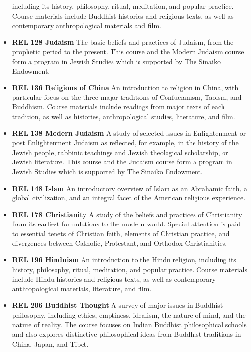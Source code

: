 \documentclass[
  letterpaper,
]{scrbook}
\begin{document}
\begin{itemize}
  including its history, philosophy, ritual, meditation, and popular
  practice. Course materials include Buddhist histories and religious
  texts, as well as contemporary anthropological materials and film.
\item
  \textbf{REL 128 Judaism} The basic beliefs and practices of Judaism,
  from the prophetic period to the present. This course and the Modern
  Judaism course form a program in Jewish Studies which is supported by
  The Sinaiko Endowment.
\item
  \textbf{REL 136 Religions of China} An introduction to religion in
  China, with particular focus on the three major traditions of
  Confucianism, Taoism, and Buddhism. Course materials include readings
  from major texts of each tradition, as well as histories,
  anthropological studies, literature, and film.\\
\item
  \textbf{REL 138 Modern Judaism} A study of selected issues in
  Enlightenment or post Enlightenment Judaism as reflected, for example,
  in the history of the Jewish people, rabbinic teachings and Jewish
  theological scholarship, or Jewish literature. This course and the
  Judaism course form a program in Jewish Studies which is supported by
  The Sinaiko Endowment.
\item
  \textbf{REL 148 Islam} An introductory overview of Islam as an
  Abrahamic faith, a global civilization, and an integral facet of the
  American religious experience.\\
\item
  \textbf{REL 178 Christianity} A study of the beliefs and practices of
  Christianity from its earliest formulations to the modern world.
  Special attention is paid to essential tenets of Christian faith,
  elements of Christian practice, and divergences between Catholic,
  Protestant, and Orthodox Christianities.
\item
  \textbf{REL 196 Hinduism} An introduction to the Hindu religion,
  including its history, philosophy, ritual, meditation, and popular
  practice. Course materials include Hindu histories and religious
  texts, as well as contemporary anthropological materials, literature,
  and film.
\item
  \textbf{REL 206 Buddhist Thought} A survey of major issues in Buddhist
  philosophy, including ethics, emptiness, idealism, the nature of mind,
  and the nature of reality. The course focuses on Indian Buddhist
  philosophical schools and also explores distinctive philosophical
  ideas from Buddhist traditions in China, Japan, and Tibet.

\end{itemize}
\end{document}
